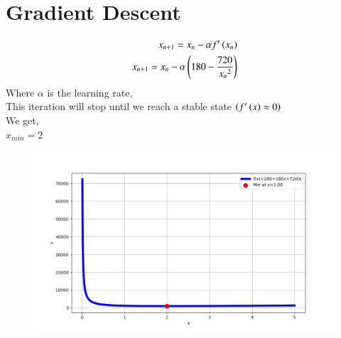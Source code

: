 \documentclass[journal,12pt,onecolumn]{IEEEtran}
\theoremstyle{remark}
\begin{document}
\section{Gradient Descent}
\begin{align}
    x_{n+1}=x_n-\alpha f^{\prime}\left(x_n\right)\\
     x_{n+1}=x_n-\alpha \left(180-\frac{720}{{x_n}^2}\right)
\end{align}
Where $\alpha$ is the learning rate,\\
This iteration will stop until we reach a stable state $\left(f^{\prime}\left(x\right) \approx0\right)$\\
We get,\\
$x_{min}=2$
\begin{figure}[h]
\centering
\includegraphics[width=\columnwidth]{figs/Q4.png}
\end{figure}
\end{document}
